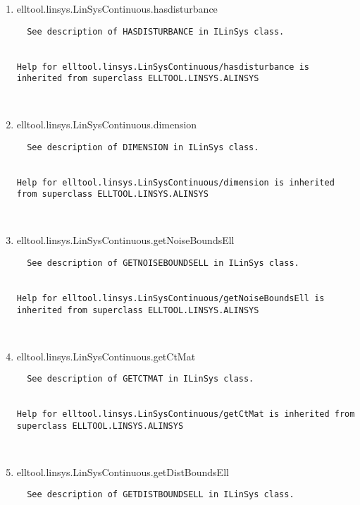 \begin{enumerate}
\begin{lstlisting}
\end{lstlisting}
\fontfamily{\familydefault}
\selectfont
\item {elltool.linsys.LinSysContinuous.hasdisturbance}
\selectfont
\begin{lstlisting}
  See description of HASDISTURBANCE in ILinSys class.


Help for elltool.linsys.LinSysContinuous/hasdisturbance is inherited from superclass ELLTOOL.LINSYS.ALINSYS



\end{lstlisting}
\fontfamily{\familydefault}
\selectfont
\item {elltool.linsys.LinSysContinuous.dimension}
\selectfont
\begin{lstlisting}
  See description of DIMENSION in ILinSys class.


Help for elltool.linsys.LinSysContinuous/dimension is inherited from superclass ELLTOOL.LINSYS.ALINSYS



\end{lstlisting}
\fontfamily{\familydefault}
\selectfont
\item {elltool.linsys.LinSysContinuous.getNoiseBoundsEll}
\selectfont
\begin{lstlisting}
  See description of GETNOISEBOUNDSELL in ILinSys class.


Help for elltool.linsys.LinSysContinuous/getNoiseBoundsEll is inherited from superclass ELLTOOL.LINSYS.ALINSYS



\end{lstlisting}
\fontfamily{\familydefault}
\selectfont
\item {elltool.linsys.LinSysContinuous.getCtMat}
\selectfont
\begin{lstlisting}
  See description of GETCTMAT in ILinSys class.


Help for elltool.linsys.LinSysContinuous/getCtMat is inherited from superclass ELLTOOL.LINSYS.ALINSYS



\end{lstlisting}
\fontfamily{\familydefault}
\selectfont
\item {elltool.linsys.LinSysContinuous.getDistBoundsEll}
\selectfont
\begin{lstlisting}
  See description of GETDISTBOUNDSELL in ILinSys class.



\end{lstlisting}
\end{enumerate}
